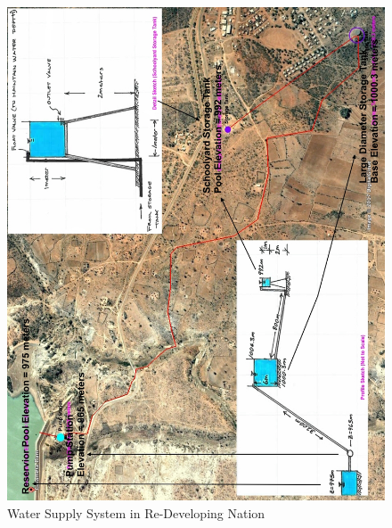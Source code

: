 \documentclass[11pt]{article}
\begin{document}
\begin{enumerate}
\begin{figure}[htbp] %
   \centering
   \includegraphics[width=6in]{AfricaSystem.jpg} 
   \caption{Water Supply System in Re-Developing Nation}
   \label{fig:AfricaSystem}
\end{figure}


\end{enumerate}
\end{document}
